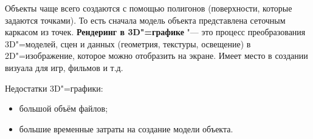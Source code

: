 Объекты чаще всего создаются с помощью полигонов (поверхности, которые задаются точками). То есть сначала модель объекта представлена сеточным каркасом из точек. \textbf{Рендеринг в 3D"=графике} "--- это процесс преобразования 3D"=моделей, сцен и данных (геометрия, текстуры, освещение) в 2D"=изображение, которое можно отобразить на экране. Имеет место в создании визуала для игр, фильмов и т.д.

Недостатки 3D"=графики:
\begin{itemize}
    \item большой объём файлов;
    \item большие временные затраты на создание модели объекта.
\end{itemize}